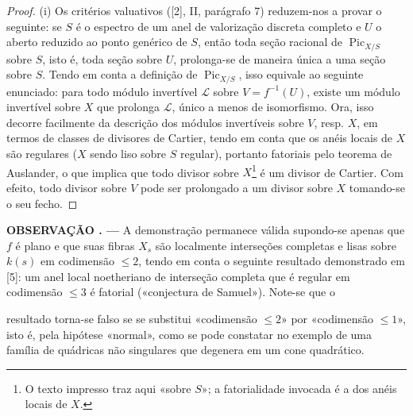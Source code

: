 \documentclass[11pt,twoside,openany]{book}
\numberwithin{equation}{section}
\newcommand{\src}[1]{%
  \phantomsection\hypertarget{src:#1}{}%
  \marginpar{\raggedleft\footnotesize\sffamily #1}%
}
\theoremstyle{plain}
\theoremstyle{definition}
\theoremstyle{remark}
\newcommand{\result}[2]{%
  \par\medskip\noindent\textbf{#1%
  \if\relax\detokenize{#2}\relax\else\space#2\fi. ---}\enspace
}
\newcommand{\FgaUnitKey}{frontmatter}
\renewcommand{\src}[1]{%
  \phantomsection\hypertarget{src:\FgaUnitKey:#1}{}%
  \marginpar{\raggedleft\footnotesize\sffamily #1}%
}
\begin{document}
\begin{proof}
(i) Os critérios valuativos ([2], II, parágrafo 7) reduzem-nos a provar o
seguinte: se $S$ é o espectro de um anel de valorização discreta completo e $U$
o aberto reduzido ao ponto genérico de $S$, então toda seção racional de
$\operatorname{Pic}_{X/S}$ sobre $S$, isto é, toda seção sobre $U$, prolonga-se
de maneira única a uma seção sobre $S$. Tendo em conta a definição de
$\operatorname{Pic}_{X/S}$, isso equivale ao seguinte enunciado: para todo
módulo invertível $\mathcal L$ sobre $V=f^{-1}(U)$, existe um módulo invertível
sobre $X$ que prolonga $\mathcal L$, único a menos de isomorfismo. Ora, isso
decorre facilmente da descrição dos módulos invertíveis sobre $V$, resp. $X$,
em termos de classes de divisores de Cartier, tendo em conta que os anéis
locais de $X$ são regulares ($X$ sendo liso sobre $S$ regular), portanto
fatoriais pelo teorema de Auslander, o que implica que todo divisor sobre
$X$\footnote{O texto impresso traz aqui «sobre $S$»; a fatorialidade invocada é
a dos anéis locais de $X$.} é um divisor de Cartier. Com efeito, todo divisor
sobre $V$ pode ser prolongado a um divisor sobre $X$ tomando-se o seu fecho.
\end{proof}

\result{OBSERVAÇÃO}{2.2} A demonstração permanece válida supondo-se apenas que
$f$ é plano e que suas fibras $X_s$ são localmente interseções completas e
lisas sobre $k(s)$ em codimensão $\leq2$, tendo em conta o seguinte resultado
demonstrado em [5]: um anel local noetheriano de interseção completa que é
regular em codimensão $\leq3$ é fatorial («conjectura de Samuel»). Note-se que o
\src{232}
resultado torna-se falso se se substitui «codimensão $\leq2$» por «codimensão
$\leq1$», isto é, pela hipótese «normal», como se pode constatar no exemplo de
uma família de quádricas não singulares que degenera em um cone quadrático.
\end{document}
